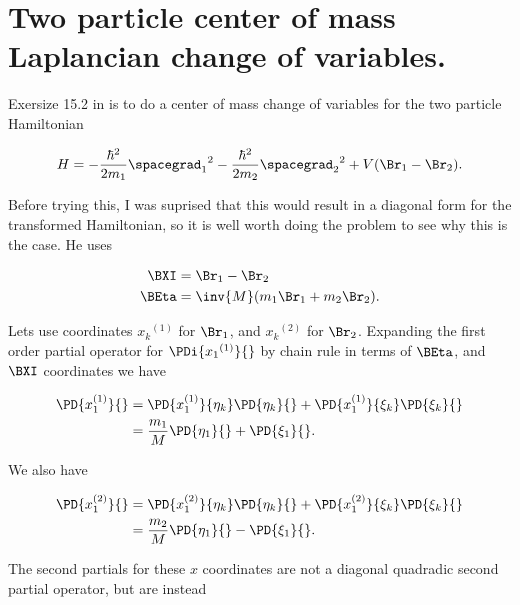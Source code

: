 

\chapter{Two particle center of mass Laplancian change of variables.}
\label{chap:twoParticleCMLaplacian}
{}
\date{Nov 30, 2009}

\beginArtWithToc

Exersize 15.2 in \cite{bohm1989qt} is to do a center of mass change of variables for the two particle Hamiltonian

\begin{align}\label{eqn:bohm15:pr2:1}
H = 
- \frac{\hbar^2}{2 m_1} {\spacegrad_1}^2
- \frac{\hbar^2}{2 m_2} {\spacegrad_2}^2
+ V(\Br_1 -\Br_2).
\end{align}

Before trying this, I was suprised that this would result in a diagonal form for the transformed Hamiltonian, so it is well worth doing the problem to see why this is the case.  He uses

\begin{align}\label{eqn:bohm15:pr2:2}
\BXI &= \Br_1 - \Br_2 \\
\BEta &= \inv{M}( m_1 \Br_1 + m_2 \Br_2 ).
\end{align}

Lets use coordinates ${x_k}^{(1)}$ for $\Br_1$, and ${x_k}^{(2)}$ for $\Br_2$.  Expanding the first order partial operator for $\PDi{{x_1}^{(1)}}{}$ by chain rule in terms of $\BEta$, and $\BXI$ coordinates we have

\begin{align*}
\PD{x_1^{(1)}}{}
&=
\PD{x_1^{(1)}}{\eta_k} \PD{\eta_k}{}
+\PD{x_1^{(1)}}{\xi_k} \PD{\xi_k}{} \\
&=
\frac{m_1}{M} \PD{\eta_1}{}
+ \PD{\xi_1}{}.
\end{align*}

We also have

\begin{align*}
\PD{x_1^{(2)}}{}
&=
\PD{x_1^{(2)}}{\eta_k} \PD{\eta_k}{}
+\PD{x_1^{(2)}}{\xi_k} \PD{\xi_k}{} \\
&=
\frac{m_2}{M} \PD{\eta_1}{}
- \PD{\xi_1}{}.
\end{align*}

The second partials for these $x$ coordinates are not a diagonal quadradic second partial operator, but are instead

